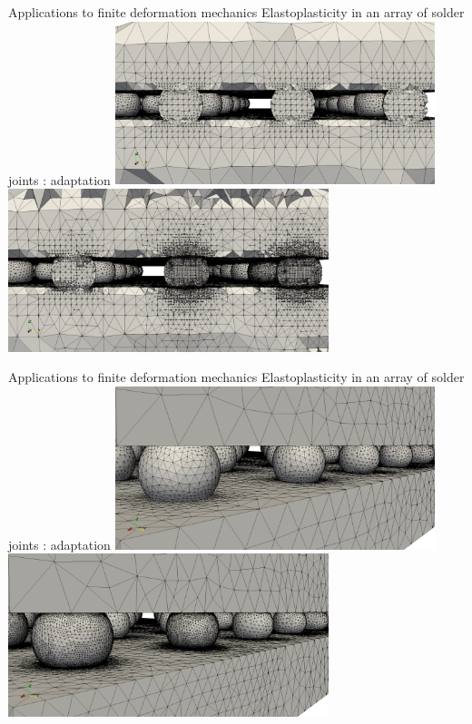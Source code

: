 \documentclass[fleqn]{beamer}
\begin{document}

\begin{frame}{Applications to finite deformation mechanics}
{Elastoplasticity in an array of solder joints : adaptation}
\centering
\includegraphics[width=0.7\textwidth]{../img/aut_solder_mesh_initial} \\
\includegraphics[width=0.7\textwidth]{../img/aut_solder_mesh_final}
\end{frame}


\begin{frame}{Applications to finite deformation mechanics}
{Elastoplasticity in an array of solder joints : adaptation}
\centering
\includegraphics[width=0.7\textwidth]{../img/aut_solder_mesh_initial2} \\
\includegraphics[width=0.7\textwidth]{../img/aut_solder_mesh_final2}
\end{frame}
\end{document}
